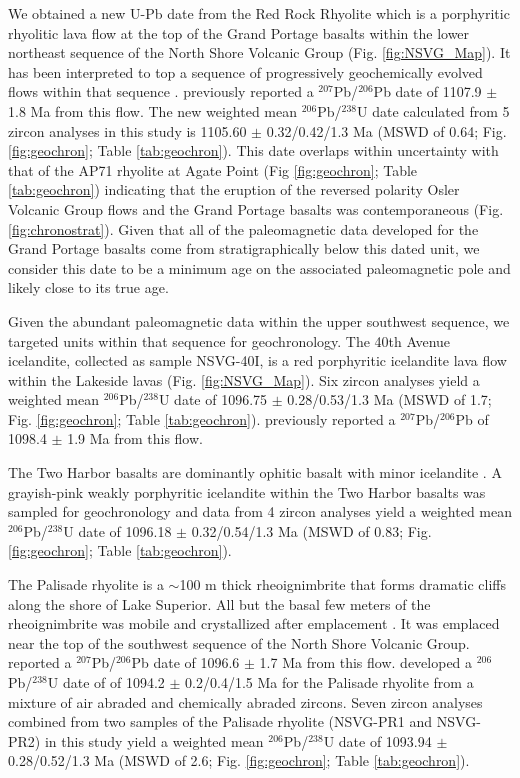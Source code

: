 \documentclass[11pt,letterpaper]{article}
\begin{document}
We obtained a new U-Pb date from the Red Rock Rhyolite which is a porphyritic rhyolitic lava flow at the top of the Grand Portage basalts within the lower northeast sequence of the North Shore Volcanic Group (Fig. \ref{fig:NSVG_Map}). It has been interpreted to top a sequence of progressively geochemically evolved flows within that sequence \citep{Green1983a}. \cite{Davis1997a} previously reported a $^{207}$Pb/$^{206}$Pb date of 1107.9 $\pm$ 1.8 Ma from this flow. The new weighted mean $^{206}$Pb/$^{238}$U date calculated from 5 zircon analyses in this study is 1105.60 $\pm$ 0.32/0.42/1.3 Ma (MSWD of 0.64; Fig. \ref{fig:geochron}; Table \ref{tab:geochron}). This date overlaps within uncertainty with that of the AP71 rhyolite at Agate Point (Fig \ref{fig:geochron}; Table \ref{tab:geochron}) indicating that the eruption of the reversed polarity Osler Volcanic Group flows and the Grand Portage basalts was contemporaneous (Fig. \ref{fig:chronostrat}). Given that all of the paleomagnetic data developed for the Grand Portage basalts come from stratigraphically below this dated unit, we consider this date to be a minimum age on the associated paleomagnetic pole and likely close to its true age.

Given the abundant paleomagnetic data within the upper southwest sequence, we targeted units within that sequence for geochronology. The 40th Avenue icelandite, collected as sample NSVG-40I, is a red porphyritic icelandite lava flow within the Lakeside lavas (Fig. \ref{fig:NSVG_Map}). Six zircon analyses yield a weighted mean $^{206}$Pb/$^{238}$U date of 1096.75 $\pm$ 0.28/0.53/1.3 Ma (MSWD of 1.7; Fig. \ref{fig:geochron}; Table \ref{tab:geochron}). \cite{Davis1997a} previously reported a $^{207}$Pb/$^{206}$Pb of 1098.4 $\pm$ 1.9 Ma from this flow.

The Two Harbor basalts are dominantly ophitic basalt with minor icelandite \citep{Boerboom2003a}. A grayish-pink weakly porphyritic icelandite within the Two Harbor basalts was sampled for geochronology and data from 4 zircon analyses yield a weighted mean $^{206}$Pb/$^{238}$U date of 1096.18 $\pm$ 0.32/0.54/1.3 Ma (MSWD of 0.83; Fig. \ref{fig:geochron}; Table \ref{tab:geochron}).

The Palisade rhyolite is a $\sim$100 m thick rheoignimbrite that forms dramatic cliffs along the shore of Lake Superior. All but the basal few meters of the rheoignimbrite was mobile and crystallized after emplacement \citep{Green1993a}. It was emplaced near the top of the southwest sequence of the North Shore Volcanic Group. \cite{Davis1997a} reported a $^{207}$Pb/$^{206}$Pb date of 1096.6 $\pm$ 1.7 Ma from this flow. \cite{Schoene2006a} developed a $^{206}$Pb/$^{238}$U date of of 1094.2 $\pm$ 0.2/0.4/1.5 Ma for the Palisade rhyolite from a mixture of air abraded and chemically abraded zircons. Seven zircon analyses combined from two samples of the Palisade rhyolite (NSVG-PR1 and NSVG-PR2) in this study yield a weighted mean $^{206}$Pb/$^{238}$U date of 1093.94 $\pm$ 0.28/0.52/1.3 Ma (MSWD of 2.6; Fig. \ref{fig:geochron}; Table \ref{tab:geochron}).
\end{document}
